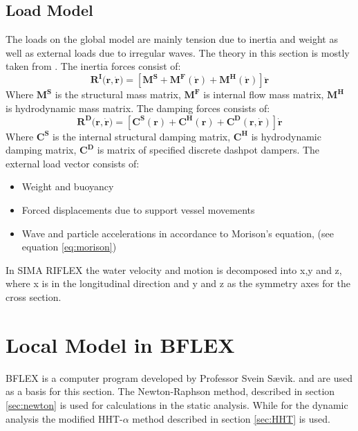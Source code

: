 \subsection{Load Model}
The loads on the global model are mainly tension due to inertia and weight as well as external loads due to irregular waves. The theory in this section is mostly taken from \cite{sintef2017}.\newline
\newline
\noindent The inertia forces consist of:
\begin{equation}
    \boldsymbol{R^I(r,\dot{r}})= [\boldsymbol{M^S} + \boldsymbol{M^F(\dot{r})} + \boldsymbol{M^H (\dot{r})} ]\boldsymbol{\ddot{r}}
\end{equation}
Where $\boldsymbol{M^S}$ is the structural mass matrix, $\boldsymbol{M^F}$ is internal flow mass matrix, $\boldsymbol{M^H}$ is hydrodynamic mass matrix. 
\newline
\newline
\noindent The damping forces consists of:
\begin{equation}
    \boldsymbol{R^D(r,\dot{r}})= [\boldsymbol{C^S(r)} + \boldsymbol{C^H(r)} + \boldsymbol{C^D (r,\dot{r})} ]\boldsymbol{\dot{r}}
\end{equation}
Where $\boldsymbol{C^S}$ is the  internal structural damping matrix, $\boldsymbol{C^H}$ is hydrodynamic damping matrix, $\boldsymbol{C^D}$ is matrix of specified discrete dashpot dampers. \newline
\newline
\noindent The external load vector consists of:
\begin{itemize}
\item Weight and buoyancy
\item Forced displacements due to support vessel movements
\item Wave and particle accelerations in accordance to Morison's equation, (see equation \ref{eq:morison})
\end{itemize}
In SIMA RIFLEX the water velocity and motion is decomposed into x,y and z, where x is in the longitudinal direction and y and z as the symmetry axes for the cross section.

\section{Local Model in BFLEX }
BFLEX is a computer program developed by Professor Svein Sævik. \cite{Bflextheory2013}  and \cite{Bflextheory2017} are used as a basis for this section.  The Newton-Raphson method, described in section \ref{sec:newton} is used for calculations in the static analysis. While for the dynamic analysis the modified HHT-$\alpha$ method described in section \ref{sec:HHT} is used.

